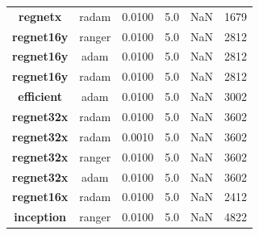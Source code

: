 \begin{table}
\begin{tabular}{c|c|c|c|c|c|}
\textbf{regnetx  } &   radam &  0.0100 &         5.0 &             NaN &          1679 \\
\textbf{regnet16y} &  ranger &  0.0100 &         5.0 &             NaN &          2812 \\
\textbf{regnet16y} &    adam &  0.0100 &         5.0 &             NaN &          2812 \\
\textbf{regnet16y} &   radam &  0.0100 &         5.0 &             NaN &          2812 \\
\textbf{efficient} &    adam &  0.0100 &         5.0 &             NaN &          3002 \\
\textbf{regnet32x} &   radam &  0.0100 &         5.0 &             NaN &          3602 \\
\textbf{regnet32x} &   radam &  0.0010 &         5.0 &             NaN &          3602 \\
\textbf{regnet32x} &  ranger &  0.0100 &         5.0 &             NaN &          3602 \\
\textbf{regnet32x} &    adam &  0.0100 &         5.0 &             NaN &          3602 \\
\textbf{regnet16x} &   radam &  0.0100 &         5.0 &             NaN &          2412 \\
\textbf{inception} &  ranger &  0.0100 &         5.0 &             NaN &          4822 \\
\bottomrule
\end{tabular}
\end{table}
